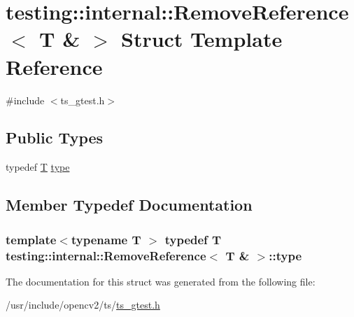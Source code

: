 \hypertarget{structtesting_1_1internal_1_1RemoveReference_3_01T_01_6_01_4}{\section{testing\-:\-:internal\-:\-:Remove\-Reference$<$ T \& $>$ Struct Template Reference}
\label{structtesting_1_1internal_1_1RemoveReference_3_01T_01_6_01_4}
}


{\ttfamily \#include $<$ts\-\_\-gtest.\-h$>$}

\subsection*{Public Types}
\begin{DoxyCompactItemize}
\item 
typedef \hyperlink{calib3d_8hpp_a3efb9551a871ddd0463079a808916717}{T} \hyperlink{structtesting_1_1internal_1_1RemoveReference_3_01T_01_6_01_4_a3d0f32a66759f333c2dd66aa31005e6d}{type}
\end{DoxyCompactItemize}


\subsection{Member Typedef Documentation}
\hypertarget{structtesting_1_1internal_1_1RemoveReference_3_01T_01_6_01_4_a3d0f32a66759f333c2dd66aa31005e6d}{
\subsubsection[{type}]{\setlength{\rightskip}{0pt plus 5cm}template$<$typename T $>$ typedef {\bf T} {\bf testing\-::internal\-::\-Remove\-Reference}$<$ {\bf T} \& $>$\-::{\bf type}}}\label{structtesting_1_1internal_1_1RemoveReference_3_01T_01_6_01_4_a3d0f32a66759f333c2dd66aa31005e6d}


The documentation for this struct was generated from the following file\-:\begin{DoxyCompactItemize}
\item 
/usr/include/opencv2/ts/\hyperlink{ts__gtest_8h}{ts\-\_\-gtest.\-h}\end{DoxyCompactItemize}
